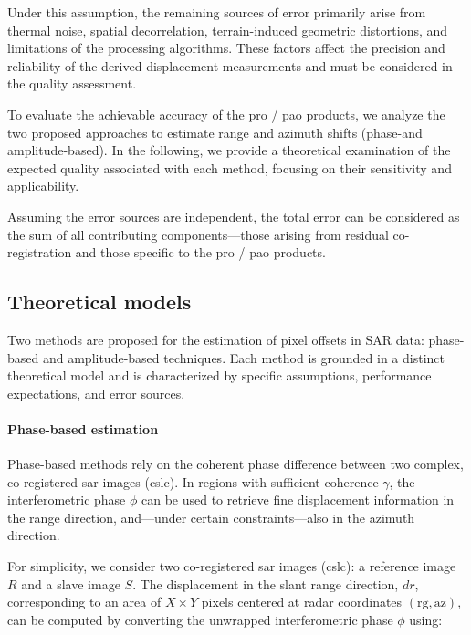 Under this assumption, the remaining sources of error primarily arise from thermal noise, spatial decorrelation, terrain-induced geometric distortions, and limitations of the processing algorithms. These factors affect the precision and reliability of the derived displacement measurements and must be considered in the quality assessment.

To evaluate the achievable accuracy of the \acs{pro} / \acs{pao} products, we analyze the two proposed approaches to estimate range and azimuth shifts (phase-and amplitude-based). In the following, we provide a theoretical examination of the expected quality associated with each method, focusing on their sensitivity and applicability.

Assuming the error sources are independent, the total error can be considered as the sum of all contributing components—those arising from residual co-registration and those specific to the \acs{pro} / \acs{pao} products.


\subsection{Theoretical models}
\label{sec:pro_pao_models}

Two methods are proposed for the estimation of pixel offsets in SAR data: phase-based and amplitude-based techniques. Each method is grounded in a distinct theoretical model and is characterized by specific assumptions, performance expectations, and error sources.

\paragraph{Phase-based estimation}

Phase-based methods rely on the coherent phase difference between two complex, co-registered \acs{sar} images (\acs{cslc}). In regions with sufficient coherence $\gamma$, the interferometric phase $\phi$ can be used to retrieve fine displacement information in the range direction, and—under certain constraints—also in the azimuth direction.

For simplicity, we consider two co-registered \acs{sar} images (\acs{cslc}): a reference image $R$ and a slave image $S$. The displacement in the slant range direction, $dr$, corresponding to an area of \(X \times Y\) pixels centered at radar coordinates \((\mathrm{rg}, \mathrm{az})\), can be computed by converting the unwrapped interferometric phase $\phi$ using:

